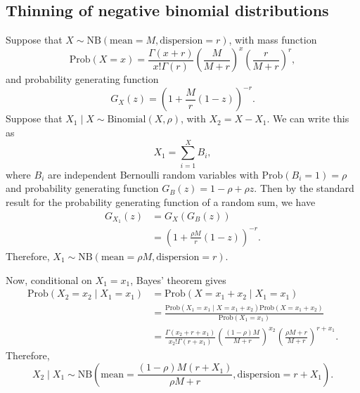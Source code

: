 \documentclass{article}
\newcommand{\NBDist}[2]{\mathrm{NB}\left(\mathrm{mean}=#1,
\mathrm{dispersion}=#2\right)}
\newcommand{\BinomialDist}[2]{\mathrm{Binomial}\left(#1, #2\right)}
\newcommand{\Prob}[1]{\mathrm{Prob}\left(#1\right)}
\begin{document}
\begin{appendix}
  \subsection{Thinning of negative binomial distributions}
  \label{sec:nb-thinning}

  Suppose that \(X\sim\NBDist{M}{r}\), with mass function
  \begin{equation}
    \Prob{X=x}=\frac{\Gamma(x+r)}{x!\Gamma(r)}\left(\frac{M}{M+r}\right)^x\left(\frac{r}{M+r}\right)^r,
  \end{equation}
  and probability generating function
  \begin{equation}
    G_X(z)=\left(1+\frac{M}{r}(1-z)\right)^{-r}.
  \end{equation}
  Suppose that \(X_{1}\mid X\sim\BinomialDist{X}{\rho}\), with
  \(X_2=X-X_1\). We can write this as
  \begin{equation}
    X_1=\sum_{i=1}^{X}B_i,
  \end{equation}
  where \(B_i\) are independent Bernoulli random variables with
  \(\Prob{B_i=1}=\rho\) and probability generating function
  \(G_B(z)=1-\rho+\rho z\). Then by the standard result for the
  probability generating function of a random sum, we have
  \begin{align}
    G_{X_1}(z)&=G_X(G_B(z))\\
    &=\left(1+\frac{\rho M}{r}(1-z)\right)^{-r}.
  \end{align}
  Therefore, \(X_1\sim\NBDist{\rho M}{r}\).

  Now, conditional on \(X_1=x_1\), Bayes' theorem gives
  \begin{align}
    \Prob{X_2=x_2\mid X_1=x_1}&=\Prob{X=x_1+x_2\mid X_1=x_1}\\
    &=\frac{\Prob{X_1=x_1\mid X=x_1+x_2}\Prob{X=x_1+x_2}}{\Prob{X_1=x_1}}\\
    &=\frac{\Gamma(x_2+r+x_1)}{x_2!\Gamma(r+x_1)}\left(\frac{(1-\rho)M}{M+r}\right)^{x_2}\left(\frac{\rho
    M+r}{M+r}\right)^{r+x_{1}}.
  \end{align}
  Therefore,
  \begin{equation}
    X_2\mid X_1\sim\NBDist{\frac{(1-\rho)M(r+X_1)}{\rho M +r}}{r+X_1}.
  \end{equation}
\end{appendix}
\end{document}
